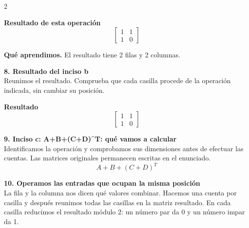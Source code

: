 \documentclass[11pt,a4paper,landscape]{article}
\begin{document}
\begin{multicols*}{2}
\begin{minipage}{\linewidth}
\par\smallskip \textbf{Resultado de esta operación}\[\begin{bmatrix}1 & 1\\1 & 0\end{bmatrix}\]
\par\smallskip\textbf{Qué aprendimos.} El resultado tiene 2 filas y 2 columnas.
\end{minipage}\par\medskip
\noindent\begin{minipage}{\linewidth}\textbf{8. Resultado del inciso b}\\[2pt]Reunimos el resultado. Comprueba que cada casilla procede de la operación indicada, sin cambiar su posición.
\par\smallskip \textbf{Resultado}\[\begin{bmatrix}1 & 1\\1 & 0\end{bmatrix}\]
\end{minipage}\par\medskip
\noindent\begin{minipage}{\linewidth}\textbf{9. Inciso c: A+B+(C+D)\textasciicircum{}T: qué vamos a calcular}\\[2pt]Identificamos la operación y comprobamos sus dimensiones antes de efectuar las cuentas. Las matrices originales permanecen escritas en el enunciado.
\[A+B+(C+D)^T\]
\end{minipage}\par\medskip
\noindent\begin{minipage}{\linewidth}\textbf{10. Operamos las entradas que ocupan la misma posición}\\[2pt]La fila y la columna nos dicen qué valores combinar. Hacemos una cuenta por casilla y después reunimos todas las casillas en la matriz resultado. En cada casilla reducimos el resultado módulo 2: un número par da 0 y un número impar da 1.
\par{}\par\smallskip

\end{minipage}
\end{multicols*}
\end{document}
